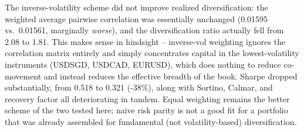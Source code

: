 \documentclass[11pt]{article}
\begin{document}
The inverse-volatility scheme did not improve realized diversification: the weighted
average pairwise correlation was essentially unchanged (0.01595 vs.\ 0.01561, marginally
\emph{worse}), and the diversification ratio actually fell from 2.08 to 1.81. This makes
sense in hindsight -- inverse-vol weighting ignores the correlation matrix entirely and
simply concentrates capital in the lowest-volatility instruments (USDSGD, USDCAD, EURUSD),
which does nothing to reduce co-movement and instead reduces the effective breadth of the
book. Sharpe dropped substantially, from 0.518 to 0.321 (-38\%), along with Sortino,
Calmar, and recovery factor all deteriorating in tandem. Equal weighting remains the
better scheme of the two tested here; naive risk parity is not a good fit for a portfolio
that was already assembled for fundamental (not volatility-based) diversification.
\end{document}
